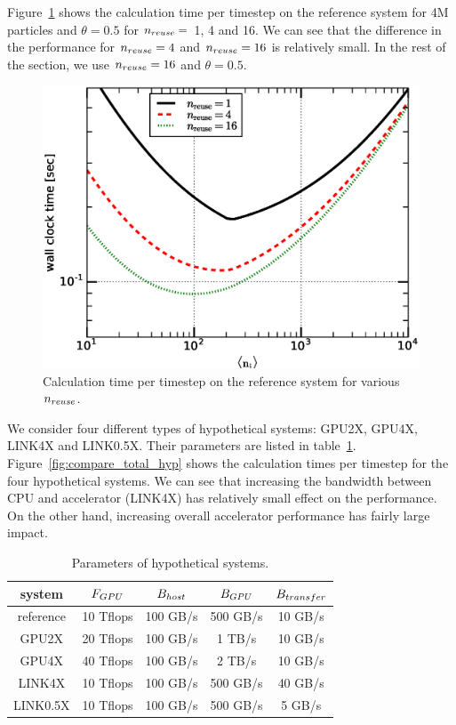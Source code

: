 \documentclass[dvipdfmx]{pasj01}
\begin{document}
Figure~\ref{fig:compare_total_n_reuse} shows the calculation time per
timestep on the reference system for 4M particles and $\theta=0.5$ for
$n_{\rm reuse}=$ 1, 4 and 16. We can see that the difference in the
performance for $n_{\rm reuse}=4$ and $n_{\rm reuse}=16$ is relatively
small. In the rest of the section, we use $n_{\rm reuse}=16$ and
$\theta=0.5$.

\begin{figure}
  \begin{center}
    \includegraphics[width=16cm]{./fig/compare_total_n_reuse.eps}
  \end{center}
  \caption{Calculation time per timestep on the reference system for
    various $n_{\rm reuse}$.}
  \label{fig:compare_total_n_reuse}
\end{figure}

We consider four different types of hypothetical systems: GPU2X,
GPU4X, LINK4X and LINK0.5X. Their parameters are listed in
table~\ref{tab:all_system}. Figure~\ref{fig:compare_total_hyp} shows
the calculation times per timestep for the four hypothetical systems.
We can see that increasing the bandwidth between CPU and accelerator
(LINK4X) has relatively small effect on the performance. On the other
hand, increasing overall accelerator performance has fairly large
impact.

\begin{table}
  \begin{tabular}{ccccc}
    \toprule system & ${F_{\rm GPU}}$ & ${B_{\rm host}}$ & ${B_{\rm GPU}}$ & ${B_{\rm transfer}}$ \\
    \midrule
    reference & 10 Tflops & 100 GB/s & 500 GB/s & 10 GB/s \\
    GPU2X     & 20 Tflops & 100 GB/s & 1   TB/s & 10 GB/s \\
    GPU4X     & 40 Tflops & 100 GB/s & 2   TB/s & 10 GB/s \\
    LINK4X    & 10 Tflops & 100 GB/s & 500 GB/s & 40 GB/s \\
    LINK0.5X    & 10 Tflops & 100 GB/s & 500 GB/s & 5  GB/s \\
  \bottomrule
  \end{tabular}
  \caption{Parameters of hypothetical systems.}
  \label{tab:all_system}
\end{table}
\end{document}
